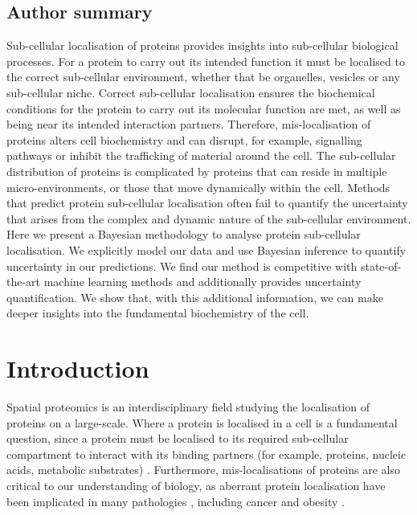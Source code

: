 \documentclass[12pt,english]{article}\usepackage[]{graphicx}\usepackage[]{color}
\begin{document}
\subsection*{Author summary}

Sub-cellular localisation of proteins provides insights into
sub-cellular biological processes. For a protein to carry out its
intended function it must be localised to the correct sub-cellular
environment, whether that be organelles, vesicles or any sub-cellular
niche. Correct sub-cellular localisation ensures the biochemical
conditions for the protein to carry out its molecular function are
met, as well as being near its intended interaction
partners. Therefore, mis-localisation of proteins alters cell
biochemistry and can disrupt, for example, signalling pathways or
inhibit the trafficking of material around the cell. The sub-cellular
distribution of proteins is complicated by proteins that can reside in
multiple micro-environments, or those that move dynamically within the
cell. Methods that predict protein sub-cellular localisation often
fail to quantify the uncertainty that arises from the complex and
dynamic nature of the sub-cellular environment. Here we present a
Bayesian methodology to analyse protein sub-cellular localisation. We
explicitly model our data and use Bayesian inference to quantify
uncertainty in our predictions. We find our
method is competitive with state-of-the-art machine learning methods
and additionally provides uncertainty quantification. We show that, with this
additional information, we can make deeper insights into the
fundamental biochemistry of the cell.



\section{Introduction}\label{Intro}

Spatial proteomics is an interdisciplinary field studying the
localisation of proteins on a large-scale. Where a protein is
localised in a cell is a fundamental question, since a protein must be
localised to its required sub-cellular compartment to interact with
its binding partners (for example, proteins, nucleic acids, metabolic
substrates) \citep{Gibson:2009}. Furthermore, mis-localisations of
proteins are also critical to our understanding of biology, as
aberrant protein localisation have been implicated in many pathologies
\citep{Olkkonen:2006, Luheshi:2008, Laurila:2009, De:2011, Cody:2013},
including cancer \citep{Kau:2004, Rodriguez:2004, Latorre:2005,
  Shin:2013} and obesity \citep{Siljee:2018}.
\end{document}
